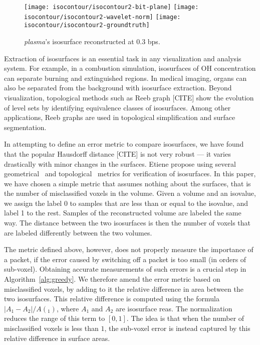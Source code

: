 \begin{figure}[h]
	\centering
	{\texttt{[image: isocontour/isocontour2-bit-plane]}}
	{\texttt{[image: isocontour/isocontour2-wavelet-norm]}}
	{\texttt{[image: isocontour/isocontour2-groundtruth]}}
	\caption{\emph{plasma}'s isosurface reconstructed at 0.3 bps.}
	\label{fig:isocontour-surfaces-plasma}
\end{figure}

Extraction of isosurfaces is an essential task in any visualization and analysis system. For
example, in a combustion simulation, isosurfaces of OH concentration can separate burning and
extinguished regions. In medical imaging, organs can also be separated from the background with
isosurface extraction. Beyond visualization, topological methods such as Reeb graph [CITE] show the
evolution of level sets by identifying equivalence classes of isosurfaces. Among other applications,
Reeb graphs are used in topological simplification and surface segmentation.

In attempting to define an error metric to compare isosurfaces, we have found that the popular
Hausdorff distance [CITE] is not very robust --- it varies drastically with minor changes in the
surfaces. Etiene \etal propose using several geometrical~\cite{verifiable-isosurface} and
topological~\cite{topology-verification-isosurface} metrics for verification of isosurfaces. In this
paper, we have chosen a simple metric that assumes nothing about the surfaces, that is the number of
misclassified voxels in the volume. Given a volume and an isovalue, we assign the label 0 to samples
that are less than or equal to the isovalue, and label 1 to the rest. Samples of the reconstructed
volume are labeled the same way. The distance between the two isosurfaces is then the number of
voxels that are labeled differently between the two volumes.

The metric defined above, however, does not properly measure the importance of a packet, if the
error caused by switching off a packet is too small (in orders of sub-voxel). Obtaining accurate
measurements of such errors is a crucial step in Algorithm~\cref{alg:greedy}. We therefore amend the
error metric based on misclassified voxels, by adding to it the relative difference in area between
the two isosurfaces. This relative difference is computed using the formula $|A_1-A_2|/A(_1)$, where
$A_1$ and $A_2$ are isosurface reas. The normalization reduces the range of this term to $[0, 1]$.
The idea is that when the number of misclassified voxels is less than $1$, the sub-voxel error is
instead captured by this relative difference in surface areas.


